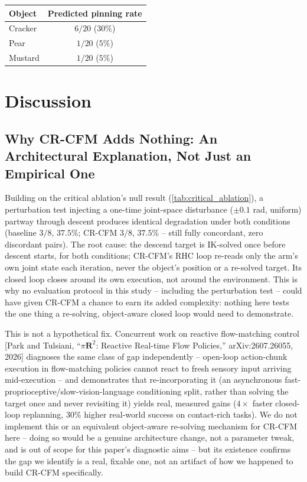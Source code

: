 \documentclass[]{interact}
\begin{document}
\begin{table}[ht]
{\begin{tabular}{lc} \toprule
Object & Predicted pinning rate \\ \midrule
Cracker & $6/20$ ($30\%$) \\
Pear & $1/20$ ($5\%$) \\
Mustard & $1/20$ ($5\%$) \\
\bottomrule
\end{tabular}}
\label{tab:pinning_predictor}
\end{table}

\section{Discussion}

\subsection{Why CR-CFM Adds Nothing: An Architectural Explanation, Not Just an Empirical One}
\label{sec:architectural}
Building on the critical ablation's null result (\cref{tab:critical_ablation}), a perturbation test
injecting a one-time joint-space disturbance ($\pm0.1$ rad, uniform) partway
through descent produces identical degradation under both conditions (baseline $3/8$, $37.5\%$;
CR-CFM $3/8$, $37.5\%$ -- still fully concordant, zero discordant pairs). The root cause: the
descend target is IK-solved once before descent starts, for both conditions; CR-CFM's RHC loop
re-reads only the arm's own joint state each iteration, never the object's position or a re-solved
target. Its closed loop closes around its own execution, not around the environment. This is why no
evaluation protocol in this study -- including the perturbation test -- could have given CR-CFM a
chance to earn its added complexity: nothing here tests the one thing a re-solving, object-aware
closed loop would need to demonstrate.

This is not a hypothetical fix. Concurrent work on reactive flow-matching control [Park and
Tulsiani, ``$\pi\mathbf{R}^2$: Reactive Real-time Flow Policies,'' arXiv:2607.26055, 2026]
diagnoses the same class of gap independently -- open-loop action-chunk execution in flow-matching
policies cannot react to fresh sensory input arriving mid-execution -- and demonstrates that
re-incorporating it (an asynchronous fast-proprioceptive/slow-vision-language conditioning split,
rather than solving the target once and never revisiting it) yields real, measured gains ($4\times$
faster closed-loop replanning, $30\%$ higher real-world success on contact-rich tasks). We do not
implement this or an equivalent object-aware re-solving mechanism for CR-CFM here -- doing so would
be a genuine architecture change, not a parameter tweak, and is out of scope for this paper's
diagnostic aims -- but its existence confirms the gap we identify is a real, fixable one, not an
artifact of how we happened to build CR-CFM specifically.
\end{document}
